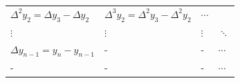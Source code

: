 \documentclass[openany]{book}
\begin{document}
\begin{longtable}[]{@{}llll@{}}
\begin{minipage}[t]{0.29\columnwidth}
\(\Delta^2 y_2 = \Delta y_{3} - \Delta y_2\)\strut
\end{minipage} & \begin{minipage}[t]{0.31\columnwidth}\raggedright
\(\Delta^3 y_2 = \Delta^2 y_{3} - \Delta^2 y_2\)\strut
\end{minipage} & \begin{minipage}[t]{0.06\columnwidth}\raggedright
\(\cdots\)\strut
\end{minipage}\tabularnewline
\begin{minipage}[t]{0.22\columnwidth}\raggedright
\(\vdots\)\strut
\end{minipage} & \begin{minipage}[t]{0.29\columnwidth}\raggedright
\(\vdots\)\strut
\end{minipage} & \begin{minipage}[t]{0.31\columnwidth}\raggedright
\(\vdots\)\strut
\end{minipage} & \begin{minipage}[t]{0.06\columnwidth}\raggedright
\(\ddots\)\strut
\end{minipage}\tabularnewline
\begin{minipage}[t]{0.22\columnwidth}\raggedright
\(\Delta y_{n-1} = y_{n} - y_{n-1}\)\strut
\end{minipage} & \begin{minipage}[t]{0.29\columnwidth}\raggedright
-\strut
\end{minipage} & \begin{minipage}[t]{0.31\columnwidth}\raggedright
-\strut
\end{minipage} & \begin{minipage}[t]{0.06\columnwidth}\raggedright
\(\cdots\)\strut
\end{minipage}\tabularnewline
\begin{minipage}[t]{0.22\columnwidth}\raggedright
-\strut
\end{minipage} & \begin{minipage}[t]{0.29\columnwidth}\raggedright
-\strut
\end{minipage} & \begin{minipage}[t]{0.31\columnwidth}\raggedright
-\strut
\end{minipage} & \begin{minipage}[t]{0.06\columnwidth}\raggedright
\(\cdots\)\strut
\end{minipage}\tabularnewline
\bottomrule
\end{longtable}
\end{document}
